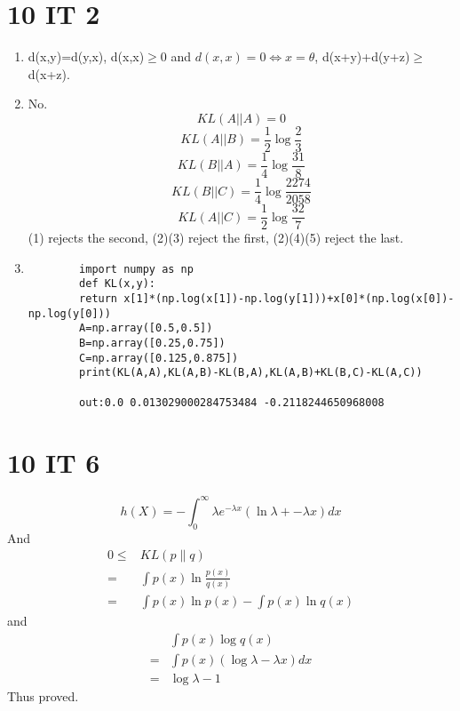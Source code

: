 \documentclass[10pt, oneside]{article}
\begin{document}
\section{10 IT 2}\begin{enumerate}
	\item d(x,y)=d(y,x), d(x,x)$\geq$0 and $d(x,x)=0\Leftrightarrow x=\theta$, d(x+y)+d(y+z)$\geq$d(x+z).
	\item No. 
	\begin{equation}
		KL(A||A)=0
	\end{equation}
	\begin{equation}
		KL(A||B)=\frac{1}{2}\log \frac{2}{3}
	\end{equation}
	\begin{equation}
		KL(B||A)=\frac{1}{4}\log \frac{31}{8}
	\end{equation}
	\begin{equation}
		KL(B||C)=\frac{1}{4}\log \frac{2274}{2058}
	\end{equation}
	\begin{equation}
	KL(A||C)=\frac{1}{2}\log \frac{32}{7}
	\end{equation}
	(1) rejects the second, (2)(3) reject the first, (2)(4)(5) reject the last. 
	\item \begin{lstlisting}
		import numpy as np
		def KL(x,y):
		return x[1]*(np.log(x[1])-np.log(y[1]))+x[0]*(np.log(x[0])-np.log(y[0]))
		A=np.array([0.5,0.5])
		B=np.array([0.25,0.75])
		C=np.array([0.125,0.875])
		print(KL(A,A),KL(A,B)-KL(B,A),KL(A,B)+KL(B,C)-KL(A,C))
		
		out:0.0 0.013029000284753484 -0.2118244650968008
	\end{lstlisting}
\end{enumerate}
\section{10 IT 6}
$$
h(X)=-\int_{0}^{\infty} \lambda e^{-\lambda x}(\ln \lambda+-\lambda x) d x
$$
And 
$$
\begin{aligned}
0 \leq& KL(p \| q) \\
=&\int p(x) \ln \frac{p(x)}{q(x)} \\
=&\int p(x) \ln p(x)-\int p(x) \ln q(x)
\end{aligned}
$$
and $$
\begin{aligned}
&\int p(x)\log q(x)\\
=&\int p(x)(\log \lambda-\lambda x) dx\\
=&\log \lambda -1
\end{aligned}
$$
Thus proved.
\end{document}
